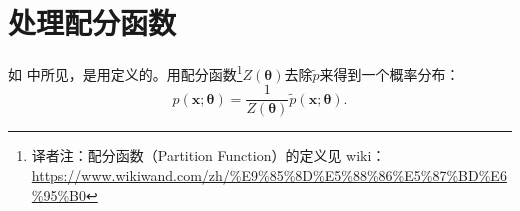 \chapter{处理配分函数}
\label{chap:18}


如 中所见，是用定义的。用配分函数\footnote{译者注：配分函数（Partition Function）的定义见 wiki：\url{https://www.wikiwand.com/zh/\%E9\%85\%8D\%E5\%88\%86\%E5\%87\%BD\%E6\%95\%B0}}\(Z(\bm{\theta})\)去除\(\widetilde{p}\)来得到一个概率分布：
\[p(\bm{x};\bm{\theta})=\frac{1}{Z(\bm{\theta})}\widetilde{p}(\bm{x};\bm{\theta}).\]